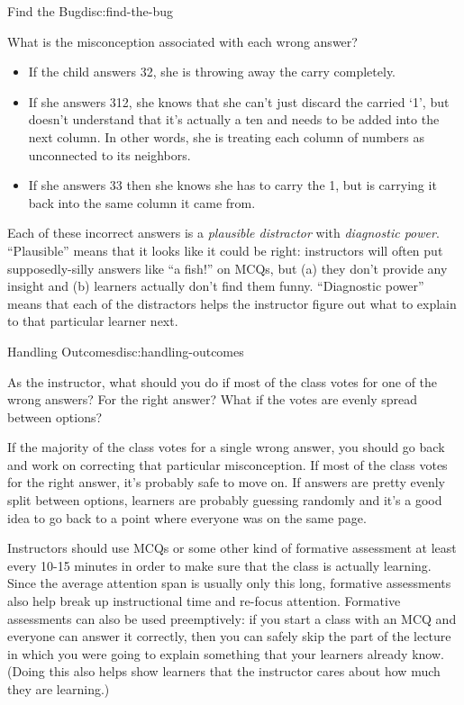 \begin{discussion}{Find the Bug}{disc:find-the-bug}

What is the misconception associated with each wrong answer?

\begin{itemize}
\item
  If the child answers 32, she is throwing away the carry completely.
\item
  If she answers 312, she knows that she can't just discard the carried
  `1', but doesn't understand that it's actually a ten and needs to be
  added into the next column. In other words, she is treating each
  column of numbers as unconnected to its neighbors.
\item
  If she answers 33 then she knows she has to carry the 1, but is
  carrying it back into the same column it came from.
\end{itemize}
\end{discussion}

Each of these incorrect answers is a \emph{plausible distractor} with
\emph{diagnostic power}. ``Plausible'' means that it looks like it could
be right: instructors will often put supposedly-silly answers like ``a
fish!'' on MCQs, but (a) they don't provide any insight and (b) learners
actually don't find them funny. ``Diagnostic power'' means that each of
the distractors helps the instructor figure out what to explain to that
particular learner next.

\begin{discussion}{Handling Outcomes}{disc:handling-outcomes}

As the instructor, what should you do if most of the class votes for one
of the wrong answers? For the right answer? What if the votes are evenly
spread between options?
\end{discussion}

If the majority of the class votes for a single wrong answer, you should
go back and work on correcting that particular misconception. If most of
the class votes for the right answer, it's probably safe to move on. If
answers are pretty evenly split between options, learners are probably
guessing randomly and it's a good idea to go back to a point where
everyone was on the same page.

Instructors should use MCQs or some other kind of formative assessment
at least every 10-15 minutes in order to make sure that the class is
actually learning. Since the average attention span is usually only this
long, formative assessments also help break up instructional time and
re-focus attention. Formative assessments can also be used preemptively:
if you start a class with an MCQ and everyone can answer it correctly,
then you can safely skip the part of the lecture in which you were going
to explain something that your learners already know. (Doing this also
helps show learners that the instructor cares about how much they are
learning.)

